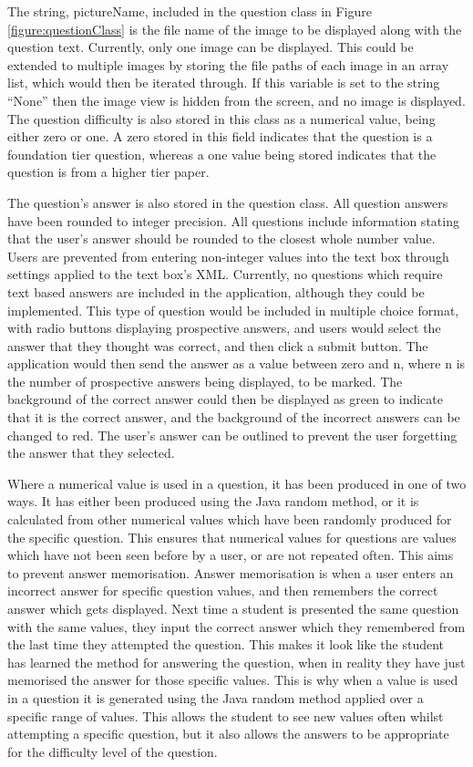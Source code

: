 \documentclass{article}
\begin{document}
The string, pictureName, included in the question class in Figure \ref{figure:questionClass} is the file name of the image to be displayed along with the question text. Currently, only one image can be displayed. This could be extended to multiple images by storing the file paths of each image in an array list, which would then be iterated through. If this variable is set to the string ``None'' then the image view is hidden from the screen, and no image is displayed. The question difficulty is also stored in this class as a numerical value, being either zero or one. A zero stored in this field indicates that the question is a foundation tier question, whereas a one value being stored indicates that the question is from a higher tier paper. \par

The question's answer is also stored in the question class. All question answers have been rounded to integer precision. All questions include information stating that the user's answer should be rounded to the closest whole number value. Users are prevented from entering non-integer values into the text box through settings applied to the text box's XML. Currently, no questions which require text based answers are included in the application, although they could be implemented. This type of question would be included in multiple choice format, with radio buttons displaying prospective answers, and users would select the answer that they thought was correct, and then click a submit button. The application would then send the answer as a value between zero and n, where n is the number of prospective answers being displayed, to be marked. The background of the correct answer could then be displayed as green to indicate that it is the correct answer, and the background of the incorrect answers can be changed to red. The user's answer can be outlined to prevent the user forgetting the answer that they selected. \par

Where a numerical value is used in a question, it has been produced in one of two ways. It has either been produced using the Java random method, or it is calculated from other numerical values which have been randomly produced for the specific question. This ensures that numerical values for questions are values which have not been seen before by a user, or are not repeated often. This aims to prevent answer memorisation. Answer memorisation is when a user enters an incorrect answer for specific question values, and then remembers the correct answer which gets displayed. Next time a student is presented the same question with the same values, they input the correct answer which they remembered from the last time they attempted the question. This makes it look like the student has learned the method for answering the question, when in reality they have just memorised the answer for those specific values. This is why when a value is used in a question it is generated using the Java random method applied over a specific range of values. This allows the student to see new values often whilst attempting a specific question, but it also allows the answers to be appropriate for the difficulty level of the question. \par
\end{document}
